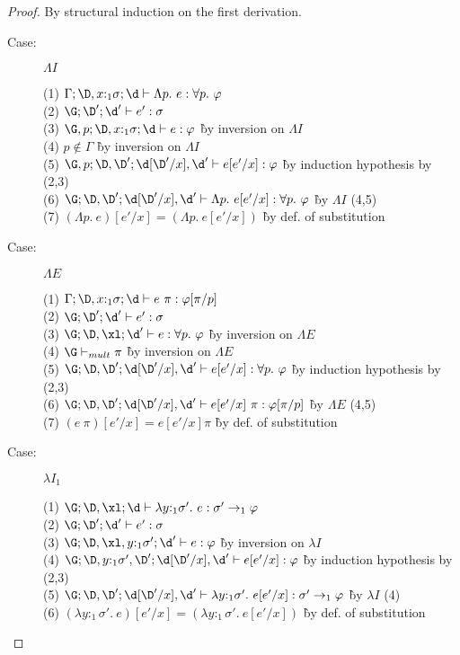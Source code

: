 \begin{proof}
By structural induction on the first derivation.

\begin{description}

\item[Case:] $\Lambda I$
\begin{tabbing}
  (1) $\Gamma; \D, x{:}_1\sigma; \d \vdash \Lambda p.~e : \forall p.~\varphi$\\
  (2) $\G; \D'; \d' \vdash e' : \sigma$\\
  (3) $\G, p; \D,x{:}_1\sigma; \d \vdash e : \varphi$ \` by inversion on $\Lambda I$\\
  (4) $p \notin \Gamma$ \` by inversion on $\Lambda I$\\
  (5) $\G,p; \D,\D'; \d[\D'/x], \d' \vdash e[e'/x] : \varphi$ \` by induction hypothesis by (2,3)\\
  (6) $\G;\D,\D';\d[\D'/x], \d' \vdash \Lambda p.~e[e'/x] : \forall p.~\varphi$ \` by $\Lambda I$ (4,5)\\
  (7) $(\Lambda p.~e)[e'/x] = (\Lambda p.~e[e'/x])$ \` by def. of substitution\\
\end{tabbing}

\item[Case:] $\Lambda E$
\begin{tabbing}
  (1) $\Gamma; \D, x{:}_1\sigma; \d \vdash e~\pi: \varphi[\pi/p]$\\
  (2) $\G; \D'; \d' \vdash e' : \sigma$\\
  (3) $\G; \D, \xl; \d' \vdash e : \forall p.~\varphi$ \` by inversion on $\Lambda E$\\
  (4) $\G \vdash_{mult} \pi$ \` by inversion on $\Lambda E$\\
  (5) $\G; \D,\D';\d[\D'/x],\d' \vdash e[e'/x] : \forall p.~\varphi$ \` by induction hypothesis by (2,3)\\
  (6) $\G; \D,\D';\d[\D'/x], \d' \vdash e[e'/x]~\pi : \varphi[\pi/p]$ \` by $\Lambda E$ (4,5)\\
  (7) $(e~\pi)[e'/x] = e[e'/x] \pi$ \` by def. of substitution\\
\end{tabbing}

\item[Case:] $\lambda I_1$
\begin{tabbing}
  (1) $\G; \D, \xl; \d \vdash \lambda y{:}_1\sigma'.~e : \sigma' \to_1 \varphi$\\
  (2) $\G; \D'; \d' \vdash e' : \sigma$\\
  (3) $\G; \D, \xl, y{:}_1\sigma'; \d' \vdash e : \varphi$ \` by inversion on $\lambda I$\\
  (4) $\G; \D, y{:}_1\sigma', \D'; \d[\D'/x], \d' \vdash e[e'/x] : \varphi$ \` by induction hypothesis by (2,3)\\
  (5) $\G; \D,\D'; \d[\D'/x],\d' \vdash \lambda y{:}_1\sigma'.~e[e'/x] : \sigma' \to_1 \varphi$ \` by $\lambda I$ (4)\\
  (6) $(\lambda y{:}_1\sigma'.~e)[e'/x] = (\lambda y{:}_1\sigma'.~e[e'/x])$ \` by def. of substitution\\
\end{tabbing}


\end{description}
\end{proof}
